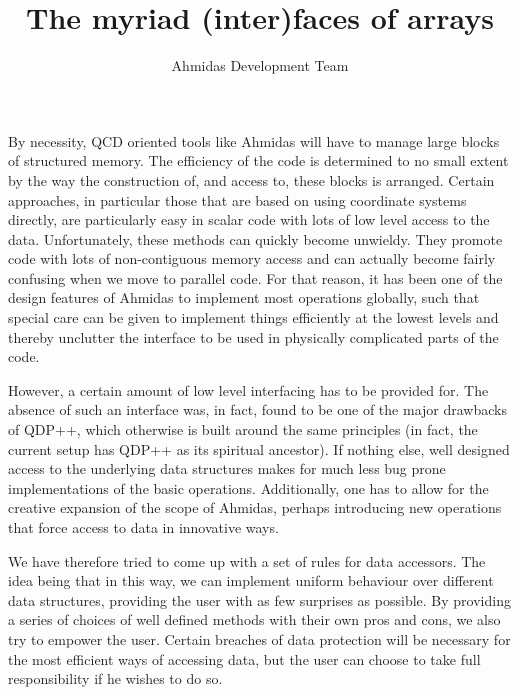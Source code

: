 \documentclass[a4paper,12pt,twoside]{article}
\author{Ahmidas Development Team}
\title{The myriad (inter)faces of arrays}
\begin{document}
\maketitle

By necessity, QCD oriented tools like Ahmidas will have to manage large blocks of structured memory. The efficiency of the code is determined to no small extent by the way the construction of, and access to, these blocks is arranged. Certain approaches, in particular those that are based on using coordinate systems directly, are particularly easy in scalar code with lots of low level access to the data. Unfortunately, these methods can quickly become unwieldy. They promote code with lots of non-contiguous memory access and can actually become fairly confusing when we move to parallel code. For that reason, it has been one of the design features of Ahmidas to implement most operations globally, such that special care can be given to implement things efficiently at the lowest levels and thereby unclutter the interface to be used in physically complicated parts of the code.

However, a certain amount of low level interfacing has to be provided for. The absence of such an interface was, in fact, found to be one of the major drawbacks of QDP++, which otherwise is built around the same principles (in fact, the current setup has QDP++ as its spiritual ancestor). If nothing else, well designed access to the underlying data structures makes for much less bug prone implementations of the basic operations. Additionally, one has to allow for the creative expansion of the scope of Ahmidas, perhaps introducing new operations that force access to data in innovative ways.

We have therefore tried to come up with a set of rules for data accessors. The idea being that in this way, we can implement uniform behaviour over different data structures, providing the user with as few surprises as possible. By providing a series of choices of well defined methods with their own pros and cons, we also try to empower the user. Certain breaches of data protection will be necessary for the most efficient ways of accessing data, but the user can choose to take full responsibility if he wishes to do so.
\end{document}
